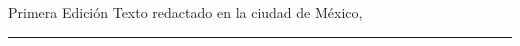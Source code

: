 \thispagestyle{empty}
\medskip
Primera Edición
\vfill
\vfill
Texto redactado en la ciudad de México, \the\year
\vspace{1cm}
\hrule